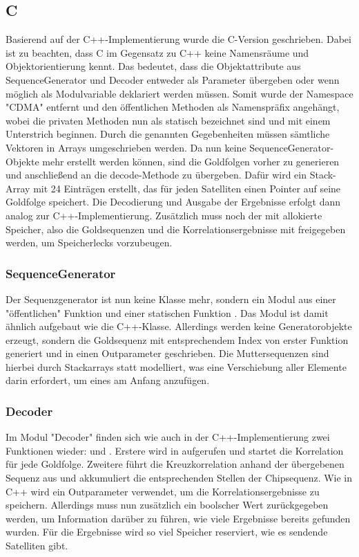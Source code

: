 \subsection{C}
Basierend auf der C++-Implementierung wurde die C-Version geschrieben. Dabei ist zu beachten, dass C im Gegensatz zu C++ keine Namensräume und Objektorientierung kennt. Das bedeutet, dass die Objektattribute aus SequenceGenerator und Decoder entweder als Parameter übergeben oder wenn möglich als Modulvariable deklariert werden müssen. Somit wurde der Namespace "CDMA" entfernt und den öffentlichen Methoden als Namenspräfix angehängt, wobei die privaten Methoden nun als statisch bezeichnet sind und mit einem Unterstrich beginnen. Durch die genannten Gegebenheiten müssen sämtliche Vektoren in Arrays umgeschrieben werden. 
Da nun keine SequenceGenerator-Objekte mehr erstellt werden können, sind die Goldfolgen vorher zu generieren und anschließend an die decode-Methode zu übergeben. Dafür wird ein Stack-Array mit 24 Einträgen erstellt, das für jeden Satelliten einen Pointer auf seine Goldfolge speichert.
Die Decodierung und Ausgabe der Ergebnisse erfolgt dann analog zur C++-Implementierung. Zusätzlich muss noch der mit  allokierte Speicher, also die Goldsequenzen und die Korrelationsergebnisse mit  freigegeben werden, um Speicherlecks vorzubeugen. 

\subsubsection*{SequenceGenerator}
Der Sequenzgenerator ist nun keine Klasse mehr, sondern ein Modul aus einer "öffentlichen" Funktion  und einer statischen Funktion . Das Modul ist damit ähnlich aufgebaut wie die C++-Klasse. Allerdings werden keine Generatorobjekte erzeugt, sondern die Goldsequenz mit entsprechendem Index von erster Funktion generiert und in einen Outparameter geschrieben. Die Muttersequenzen sind hierbei durch Stackarrays statt  modelliert, was eine Verschiebung aller Elemente darin erfordert, um eines am Anfang anzufügen.

\subsubsection*{Decoder}
Im Modul "Decoder" finden sich wie auch in der C++-Implementierung zwei Funktionen wieder:  und . Erstere wird in  aufgerufen und startet die Korrelation für jede Goldfolge. Zweitere führt die Kreuzkorrelation anhand der übergebenen Sequenz aus und akkumuliert die entsprechenden Stellen der Chipsequenz. Wie in C++ wird ein Outparameter verwendet, um die Korrelationsergebnisse zu speichern. Allerdings muss nun zusätzlich ein boolscher Wert zurückgegeben werden, um Information darüber zu führen, wie viele Ergebnisse bereits gefunden wurden. Für die Ergebnisse wird so viel Speicher reserviert, wie es sendende Satelliten gibt.
